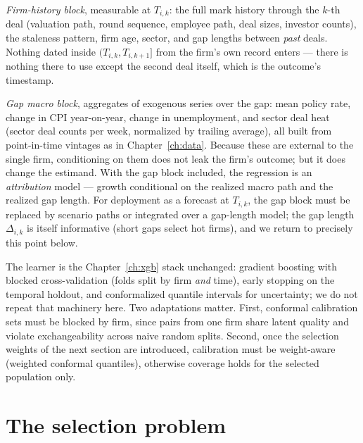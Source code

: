 \emph{Firm-history block}, measurable at $T_{i,k}$: the full mark history through the
$k$-th deal (valuation path, round sequence, employee path, deal sizes, investor counts),
the staleness pattern, firm age, sector, and gap lengths between \emph{past} deals.
Nothing dated inside $(T_{i,k}, T_{i,k+1}]$ from the firm's own record enters --- there is
nothing there to use except the second deal itself, which is the outcome's timestamp.

\emph{Gap macro block}, aggregates of exogenous series over the gap: mean policy rate,
change in CPI year-on-year, change in unemployment, and sector deal heat (sector deal
counts per week, normalized by trailing average), all built from point-in-time vintages as
in Chapter~\ref{ch:data}. Because these are external to the single firm, conditioning on
them does not leak the firm's outcome; but it does change the estimand. With the gap block
included, the regression is an \emph{attribution} model --- growth conditional on the
realized macro path and the realized gap length. For deployment as a forecast at $T_{i,k}$,
the gap block must be replaced by scenario paths or integrated over a gap-length model;
the gap length $\Delta_{i,k}$ is itself informative (short gaps select hot firms), and we
return to precisely this point below.

The learner is the Chapter~\ref{ch:xgb} stack unchanged: gradient boosting with blocked
cross-validation (folds split by firm \emph{and} time), early stopping on the temporal
holdout, and conformalized quantile intervals for uncertainty; we do not repeat that
machinery here. Two adaptations matter. First, conformal calibration sets must be blocked
by firm, since pairs from one firm share latent quality and violate exchangeability across
naive random splits. Second, once the selection weights of the next section are
introduced, calibration must be weight-aware (weighted conformal quantiles), otherwise
coverage holds for the selected population only.

\section{The selection problem}
\label{sec:us-selection}

